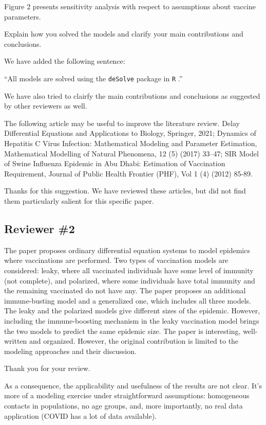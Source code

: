 \documentclass[12pt]{article}
\newcommand{\rev}{\subsection*}
\newcommand{\revtext}{\textsf}
\begin{document}
Figure 2 presents sensitivity analysis with respect to assumptions about vaccine parameters.

\revtext{Explain how you solved the models and clarify your main contributions and conclusions.}

We have added the following sentence:

``All models are solved using the \texttt{deSolve} package \citep{soetaert2010solving} in \texttt{R} \citep{Rlang}.''

We have also tried to clairfy the main contributions and conclusions as suggested by other reviewers as well.

\revtext{The following article may be useful to improve the literature review. Delay Differential Equations and Applications to Biology, Springer,  2021; Dynamics of Hepatitis C Virus Infection: Mathematical Modeling and Parameter Estimation, Mathematical Modelling of Natural Phenomena, 12 (5) (2017) 33–47; SIR Model of Swine Influenza Epidemic in Abu Dhabi: Estimation of Vaccination Requirement, Journal of Public Health Frontier (PHF), Vol 1 (4) (2012) 85-89.}

Thanks for this suggestion. We have reviewed these articles, but did not find them particularly salient for this specific paper.

\rev{Reviewer \#2}

\revtext{The paper proposes ordinary differential equation systems to model epidemics where vaccinations are performed. Two types of vaccination models are considered: leaky, where all vaccinated individuals have some level of immunity (not complete), and polarized, where some individuals have total immunity and the remaining vaccinated do not have any. The paper proposes an additional immune-busting model and a generalized one, which includes all three models. The leaky and the polarized models give different sizes of the epidemic. However, including the immune-boosting mechanism in the leaky vaccination model brings the two models to predict the same epidemic size.
The paper is interesting, well-written and organized. However, the original contribution is limited to the modeling approaches and their discussion.}

Thank you for your review.

\revtext{As a consequence, the applicability and usefulness of the results are not clear. It's more of a modeling exercise under straightforward assumptions: homogeneous contacts in populations, no age groups, and, more importantly, no real data application (COVID has a lot of data available).}
\end{document}

